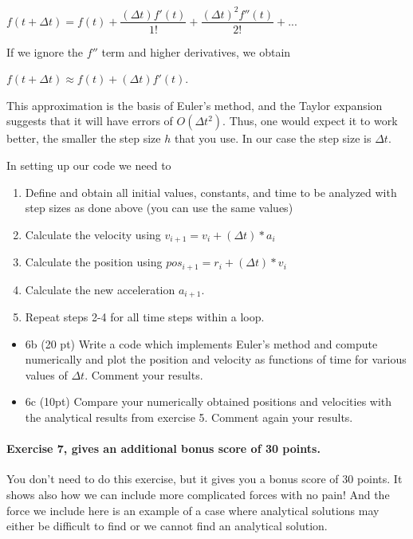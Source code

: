 \documentclass[%
oneside,                 %
final,                   %
10pt]{article}
\begin{document}
$f(t+\Delta t) = f(t) + \dfrac{(\Delta t)f'(t)}{1!} + \dfrac{(\Delta t)^2f''(t)}{2!} + ...$

If we ignore the $f''$ term and higher derivatives, we obtain

$f(t+\Delta t) \approx f(t) + (\Delta t)f'(t)$.

This approximation is the basis of Euler's method, and the Taylor
expansion suggests that it will have errors of $O(\Delta t^2)$.  Thus, one
would expect it to work better, the smaller the step size $h$ that you
use. In our case the step size is $\Delta t$. 

In setting up our code we need to

\begin{enumerate}
\item Define and obtain all initial values, constants, and time to be analyzed with step sizes as done above (you can use the same values)

\item Calculate the velocity using $v_{i+1} = v_{i} + (\Delta t)*a_{i}$

\item Calculate the position using $pos_{i+1} = r_{i} + (\Delta t)*v_{i}$

\item Calculate the new acceleration $a_{i+1}$.

\item Repeat steps 2-4 for all time steps within a loop.

\end{enumerate}

\noindent
\begin{itemize}
\item 6b (20 pt) Write a code which implements Euler's method and compute numerically and plot the position and velocity as functions of time for various values of $\Delta t$. Comment your results.



\item 6c (10pt) Compare your numerically obtained positions and velocities with the analytical results from exercise 5. Comment again your results.
\end{itemize}

\paragraph{Exercise 7, gives an additional bonus score of 30 points.}
You don't need to do this exercise, but it gives you a bonus score of 30 points. It shows also how we can include more complicated forces with no pain! And the force we include here is an example of a case where analytical solutions may either be difficult to find or we cannot find an analytical solution. 
\end{document}
